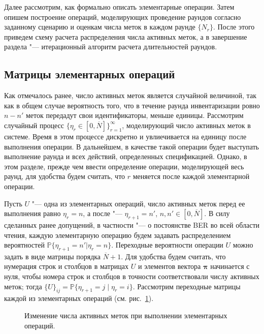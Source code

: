 Далее рассмотрим, как формально описать элементарные операции. Затем опишем построение операций, моделирующих проведение раундов согласно заданному сценарию и оценкам числа меток в каждом раунде $\{N_r\}$. После этого приведем схему расчета распределения числа активных меток, а в завершение раздела "--- итерационный алгоритм расчета длительностей раундов.


\subsection{Матрицы элементарных операций}\label{subsec:ch3_bg_elem_op_matrices}
Как отмечалось ранее, число активных меток является случайной величиной, так как в общем случае вероятность того, что в течение раунда инвентаризации ровно $n - n'$ меток передадут свои идентификаторы, меньше единицы. Рассмотрим случайный процесс $\{ \eta_r \in [0, \overline{N}] \}_{r=1}^\infty$, моделирующий число активных меток в системе. Время в этом процессе дискретно и увлиечивается на единицу после выполнения операции. В дальнейшем, в качестве такой операции будет выступать выполнение раунда и всех действий, определенных спецификацией. Однако, в этом разделе, прежде чем ввести определение операции, моделирующей весь раунд, для удобства будем считать, что $r$ меняется после каждой элементарной операции.

Пусть $U$ "--- одна из элементарных операций, число активных меток перед ее выполнения равно $\eta_r = n$, а после "--- $\eta_{r+1} = n'$, $n,n' \in [0,\overline{N}]$. В силу сделанных ранее допущений, в частности "--- о постоянстве BER во всей области чтения, каждую элементарную операцию будем задавать распределением вероятностей $\mathbb{P}\{\eta_{r+1} = n' | \eta_r = n\}$. Переходные вероятности операции $U$ можно задать в виде матрицы порядка $\overline{N} + 1$. Для удобства будем считать, что нумерация строк и столбцов в матрицах $U$ и элементов вектора $\bm{\pi}$ начинается с нуля, чтобы номера строк и столбцов в точности соответствовали числу активных меток; тогда $\{ U \}_{ij} = \mathbb{P}\{ \eta_{r+1} = j\; |\; \eta_{r} = i \}$. Рассмотрим переходные матрицы каждой из элементарных операций (см. рис.~\ref{fig:ch3_bg_trans}).

\begin{figure}[htb]
  \caption{Изменение числа активных меток при выполнении элементарных операций.}
  \label{fig:ch3_bg_trans}
\end{figure}

